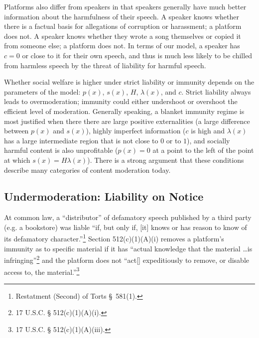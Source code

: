 Platforms also differ from speakers in that speakers generally have much better information about the harmfulness of their speech. A speaker knows whether there is a factual basis for allegations of corruption or harassment; a platform does not. A speaker knows whether they wrote a song themselves or copied it from someone else; a platform does not. In terms of our model, a speaker has $c = 0$ or close to it for their own speech, and thus is much less likely to be chilled from harmless speech by the threat of liability for harmful speech.

Whether social welfare is higher under strict liability or immunity depends on the parameters of the model:  $p(x)$, $s(x)$, $H$, $\lambda(x)$, and $c$. Strict liability always leads to overmoderation; immunity could either undershoot or overshoot the efficient level of moderation. Generally speaking, a blanket immunity regime is most justified when there there are large positive externalities (a large difference between $p(x)$ and $s(x)$), highly imperfect information ($c$ is high and $\lambda(x)$ has a large intermediate region that is not close to $0$ or to $1$), and socially harmful content is also unprofitable ($p(x) = 0$ at a point to the left of the point at which $s(x) = H\lambda(x)$). There is a strong argument that these conditions describe many categories of content moderation today.


\subsection{Undermoderation: Liability on Notice}

At common law, a ``distributor'' of defamatory speech published by a third party (e.g. a bookstore) was liable ``if, but only if, [it] knows or has reason to know of its defamatory character.''\footnote{Restatment (Second) of Torts §~581(1).}  Section 512(c)(1)(A)(i) removes a platform's immunity as to specific material if it has ``actual knowledge that the material \ldots is infringing''\footnote{17 U.S.C. § 512(c)(1)(A)(i).} and the platform does not ``act[] expeditiously to remove, or disable access to, the material.''\footnote{17 U.S.C. § 512(c)(1)(A)(iii).} 

